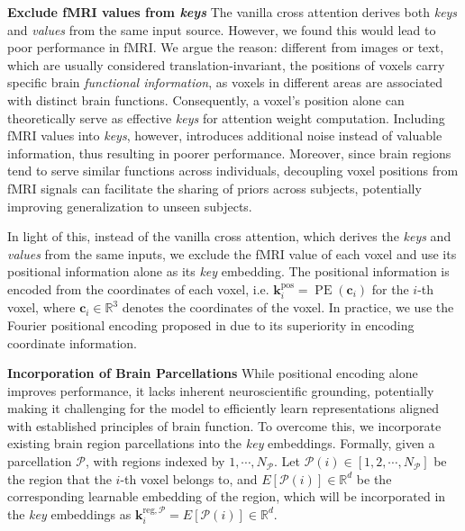 \noindent\textbf{Exclude fMRI values from \textit{keys}}
The vanilla cross attention \cite{zhu2020deformable,vaswani2017attention} derives both \textit{keys} and \textit{values} from the same input source. However, we found this would lead to poor performance in fMRI. We argue the reason: different from images or text, which are usually considered translation-invariant, the positions of voxels carry specific brain \textit{functional information}, as voxels in different areas are associated with distinct brain functions. Consequently, a voxel's position alone can theoretically serve as effective \textit{keys} for attention weight computation. Including fMRI values into \textit{keys}, however, introduces additional noise instead of valuable information, thus resulting in poorer performance. Moreover, since brain regions tend to serve similar functions across individuals, decoupling voxel positions from fMRI signals can facilitate the sharing of priors across subjects, potentially improving generalization to unseen subjects.

In light of this, instead of the vanilla cross attention, which derives the \textit{keys} and \textit{values} from the same inputs, we exclude the fMRI value of each voxel and use its positional information alone as its \textit{key} embedding. The positional information is encoded from the coordinates of each voxel, i.e. $\boldsymbol{k}_i^{\text{pos}} = \operatorname{PE}(\boldsymbol{c}_i)$ for the $i$-th voxel, where $\boldsymbol{c}_i \in \mathbb{R}^3$ denotes the coordinates of the voxel. In practice, we use the Fourier positional encoding proposed in \cite{tancik2020fourier} due to its superiority in encoding coordinate information.

\noindent\textbf{Incorporation of Brain Parcellations}
While positional encoding alone improves performance, it lacks inherent neuroscientific grounding, potentially making it challenging for the model to efficiently learn representations aligned with established principles of brain function. To overcome this, we incorporate existing brain region parcellations \cite{glasser2016multi,rolls2020automated} into the \textit{key} embeddings. Formally, given a parcellation $\mathcal{P}$, with regions indexed by $1, \cdots, N_\mathcal{P}$. Let $\mathcal{P}(i) \in [1, 2, \cdots, N_\mathcal{P}]$ be the region that the $i$-th voxel belongs to, and $E[\mathcal{P}(i)] \in \mathbb{R}^d$ be the corresponding learnable embedding of the region, which will be incorporated in the \textit{key} embeddings as $\boldsymbol{k}_i^{\text{reg}, \mathcal{P}} = E[\mathcal{P}(i)] \in \mathbb{R}^d$.

